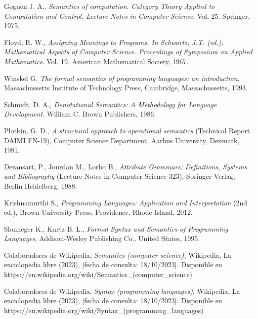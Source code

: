 \begin{thebibliography}{11}
    \bibitem{}
    \label{sec:20}
    \hypertarget{20}{}
    Goguen J. A., \textit{Semantics of computation. Category Theory Applied to Computation and Control. Lecture Notes in Computer Science}. Vol. 25. Springer, 1975.

    \bibitem{}
    \label{sec:21}
    \hypertarget{21}{}
    Floyd, R. W., \textit{Assigning Meanings to Programs. In Schwartz, J.T. (ed.). Mathematical Aspects of Computer Science. Proceedings of Symposium on Applied Mathematics}. Vol. 19. American Mathematical Society, 1967.

    \bibitem{}
    \label{sec:22}
    \hypertarget{22}{}
    Winskel G.  \textit{The formal semantics of programming languages: an introduction}, Massachussetts Institute of Technology Press, Cambridge, Massachussetts, 1993.

    \bibitem{}
    \label{sec:23}
    \hypertarget{23}{}
    Schmidt, D. A., \textit{Denotational Semantics: A Methodology for Language Development}. William C. Brown Publishers, 1986.

    \bibitem{}
    \label{sec:24}
    \hypertarget{24}{}
    Plotkin, G. D., \textit{A structural approach to operational semantics} (Technical Report DAIMI FN-19), Computer Science Department, Aarhus University, Denmark, 1981.
    
    \bibitem{}
    \label{sec:25}
    \hypertarget{25}{}
    Deransart, P., Jourdan M., Lorho B.,  \textit{Attribute Grammars: Definitions, Systems and Bibliography} (Lecture Notes in Computer Science 323), Springer-Verlag, Berlin Heidelberg, 1988.

    \bibitem{}
    \label{sec:26}
    \hypertarget{26}{}
    Krishnamurthi S., \textit{Programming Languages: Application and Interpretation} (2nd ed.), Brown University Press, Providence, Rhode Island, 2012.

    \bibitem{}
    \label{sec:27}
    \hypertarget{27}{}
    Slonneger K., Kurtz B. L., \textit{Formal Syntax and Semantics of Programming Languages}, Addison-Wesley Publishing Co., United States, 1995.

    \bibitem{}
    \label{sec:28}
    \hypertarget{28}{}
    Colaboradores de Wikipedia, \textit{Semantics (computer science)}, Wikipedia, La enciclopedia libre (2023), [fecha de consulta: 18/10/2023]. Disponible en https://en.wikipedia.org/wiki/Semantics\_(computer\_science)

    \bibitem{}
    \label{sec:29}
    \hypertarget{29}{}
    Colaboradores de Wikipedia, \textit{Syntax (programming languages)}, Wikipedia, La enciclopedia libre (2023), [fecha de consulta: 18/10/2023]. Disponible en https://en.wikipedia.org/wiki/Syntax\_(programming\_languages)


\end{thebibliography}
